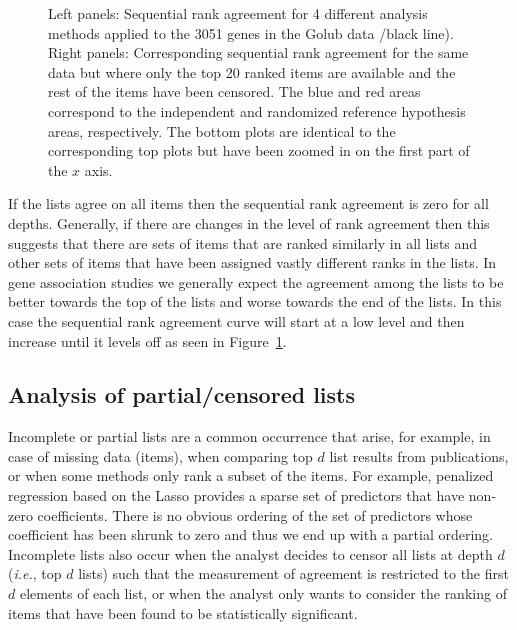 \documentclass[12pt,a4paper]{article}
\makeatletter
\newcommand{\ie}{\emph{i.e.}\@\xspace}
\theoremstyle{plain}
\makeatother
\begin{document}
\begin{figure}[htbp]
\begin{center}
 \end{center}
 \caption{Left panels: Sequential rank agreement for 4 different
   analysis methods applied to the 3051 genes in the Golub data /black
   line). Right
   panels: Corresponding sequential rank agreement for the same data
   but where only the top 20 ranked items are available and the rest
   of the items have been censored. The blue and
   red areas correspond to the independent and randomized reference
   hypothesis areas, respectively. The bottom plots are identical to
   the corresponding top plots but have been zoomed in on the first
   part of the $x$ axis.}
 \label{fig:example1}
 \end{figure}

 If the lists agree on all items then the sequential rank agreement is
 zero for all depths. Generally, if there are changes in the level of
 rank agreement then this suggests that there are sets of items that
 are ranked similarly in all lists and other sets of items that have
 been assigned vastly different ranks in the lists. In gene
 association studies we generally expect the agreement among the lists
 to be better towards the top of the lists and worse towards the end
 of the lists. In this case the sequential rank agreement curve will
 start at a low level and then increase until it levels off as seen in
 Figure~\ref{fig:example1}.

\subsection{Analysis of partial/censored lists}
Incomplete or partial lists are a common occurrence that arise, for
example, in case of missing data (items), when comparing top $d$ list
results from publications, or when some methods only rank a subset of
the items. For example, penalized regression based on the Lasso
provides a sparse set of predictors that have non-zero
coefficients. There is no obvious ordering of the set of predictors
whose coefficient has been shrunk to zero and thus we end up with a
partial ordering. Incomplete lists also occur when the analyst decides
to censor all lists at depth $d$ (\ie, top $d$ lists) such that the
measurement of agreement is restricted to the first $d$ elements of
each list, or when the analyst only wants to consider the ranking of
items that have been found to be statistically significant.
\end{document}
